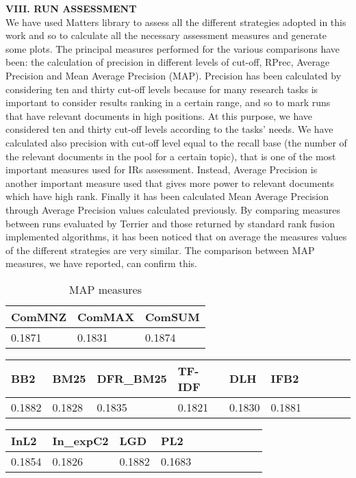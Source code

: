 \documentclass[12pt,journal]{IEEEtran}
\begin{document}
\textbf{VIII.	RUN ASSESSMENT} \\
We have used Matters library to assess all the different strategies adopted in this work and so to calculate all the necessary assessment measures and generate some plots.
The principal measures performed for the various comparisons have been: the calculation of precision in different levels of cut-off, RPrec, Average Precision and Mean Average Precision (MAP).
Precision has been calculated by considering ten and thirty cut-off levels because for many research tasks is important to consider results ranking in a certain range, and so to mark runs that have relevant documents in high positions. At this purpose, we have considered ten and thirty cut-off levels according to the tasks' needs. We have calculated also precision with cut-off level equal to the recall base (the number of the relevant documents in the pool for a certain topic), that is one of the most important measures used for IRs assessment.
Instead, Average Precision is another important measure used that gives more power to relevant documents which have high rank.
Finally it has been calculated Mean Average Precision through Average Precision values calculated previously.
By comparing measures between runs evaluated by Terrier and those returned by standard rank fusion implemented algorithms, it has been noticed that on average the measures values of the different strategies are very similar. The comparison between MAP measures, we have reported, can confirm this.

\begin{table}[h!]
\centering
\caption{MAP measures}
\begin{tabular}{|l|l|l|}
\hline
ComMNZ & ComMAX & ComSUM \\ \hline
0.1871 & 0.1831 & 0.1874 \\ \hline
\end{tabular}
\end{table}

\begin{table}[h!]
\centering
\begin{tabular}{|l|l|l|l|l|l|l|l|l|l|}
\hline
BB2    & BM25   & DFR\_BM25 & TF-IDF & DLH & IFB2     \\ \hline
0.1882 & 0.1828 & 0.1835    & 0.1821 & 0.1830 & 0.1881 \\ \hline

\end{tabular}
\end{table}

\begin{table}[h!]
\centering
\begin{tabular}{|l|l|l|l|l|l|l|l|l|l|}
\hline
InL2   & In\_expC2 & LGD    & PL2        \\ \hline
0.1854 & 0.1826    & 0.1882 & 0.1683      \\ \hline

\end{tabular}
\end{table}
\end{document}
